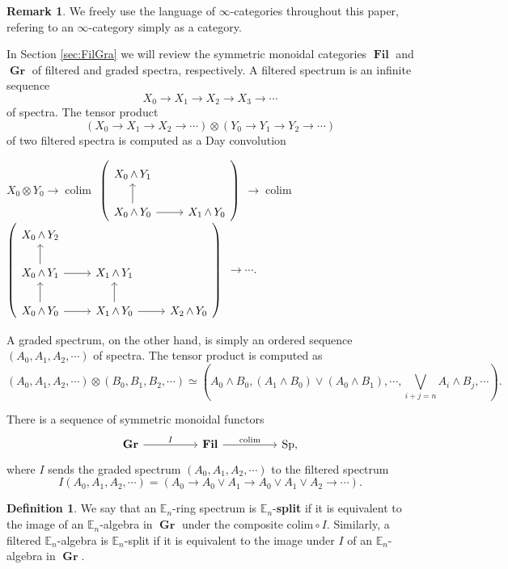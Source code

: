 \documentclass[oneside]{amsart}
\theoremstyle{definition}
\newtheorem{dfn}[nul]{Definition}
\newtheorem{rmk}[nul]{Remark}
\theoremstyle{plain}
\DeclareMathOperator*{\colim}{\text{colim}}
\DeclareMathOperator{\smsh}{\wedge}
\DeclareMathOperator{\Gr}{\textbf{Gr}}
\DeclareMathOperator{\Fil}{\textbf{Fil}}
\DeclareMathOperator{\Sp}{\text{Sp}}
\begin{document}
\begin{rmk}
We freely use the language of $\infty$-categories throughout this paper, refering to an $\infty$-category simply as a category.
\end{rmk}

In Section \ref{sec:FilGra} we will review the symmetric monoidal categories $\Fil$ and $\Gr$ of filtered and graded spectra, respectively.  A filtered spectrum is an infinite sequence
$$X_0 \longrightarrow X_1 \longrightarrow X_2 \longrightarrow X_3 \longrightarrow \cdots$$
of spectra.  The tensor product $$\left(X_0 \longrightarrow X_1 \longrightarrow X_2 \longrightarrow \cdots \right) \otimes \left(Y_0 \longrightarrow Y_1 \longrightarrow Y_2 \longrightarrow \cdots \right)$$
of two filtered spectra is computed as a Day convolution

\begin{center}
$X_0 \otimes Y_0 \longrightarrow \colim $
{$ \left(\begin{tikzcd} X_0 \smsh Y_1 \\  X_0 \smsh Y_0 \arrow{u} \arrow{r} & X_1 \smsh Y_0 \end{tikzcd} \right) $} 
$\longrightarrow \colim$
 {$ \left( \begin{tikzcd} X_0 \smsh Y_2 \\ X_0 \smsh Y_1 \arrow{r} \arrow{u} & X_1 \smsh Y_1  \\ X_0 \smsh Y_0 \arrow{r} \arrow{u} & X_1 \smsh Y_0 \arrow{u} \arrow{r} & X_2 \smsh Y_0 \end{tikzcd} \right) $}
$\longrightarrow \cdots.$
\end{center}

A graded spectrum, on the other hand, is simply an ordered sequence $(A_0,A_1,A_2, \cdots)$ of spectra.  The tensor product  is computed as
$$(A_0,A_1,A_2,\cdots) \otimes (B_0,B_1,B_2,\cdots) \simeq \left( A_0 \smsh B_0, (A_1 \smsh B_0) \vee (A_0 \smsh B_1), \cdots, \bigvee_{i+j=n} A_i \smsh B_j, \cdots \right).$$

There is a sequence of symmetric monoidal functors
$$
\begin{tikzcd}[column sep=huge]
\Gr \arrow{r}{I} & \Fil \arrow{r}{\text{colim}} & \Sp,
\end{tikzcd}
$$
where $I$ sends the graded spectrum $(A_0,A_1,A_2,\cdots)$ to the filtered spectrum
$$
I(A_0,A_1,A_2,\cdots) = \left( A_0 \longrightarrow A_0 \vee A_1 \longrightarrow A_0 \vee A_1 \vee A_2 \longrightarrow \cdots\right).
$$

\begin{dfn}
We say that an $\mathbb{E}_n$-ring spectrum is $\mathbb{E}_n$-\textbf{split} if it is equivalent to the image of an $\mathbb{E}_n$-algebra in $\Gr$ under the composite $\text{colim} \circ I.$  Similarly, a filtered $\mathbb{E}_n$-algebra is $\mathbb{E}_n$-split if it is equivalent to the image under $I$ of an $\mathbb{E}_n$-algebra in $\Gr$.
\end{dfn}
\end{document}
